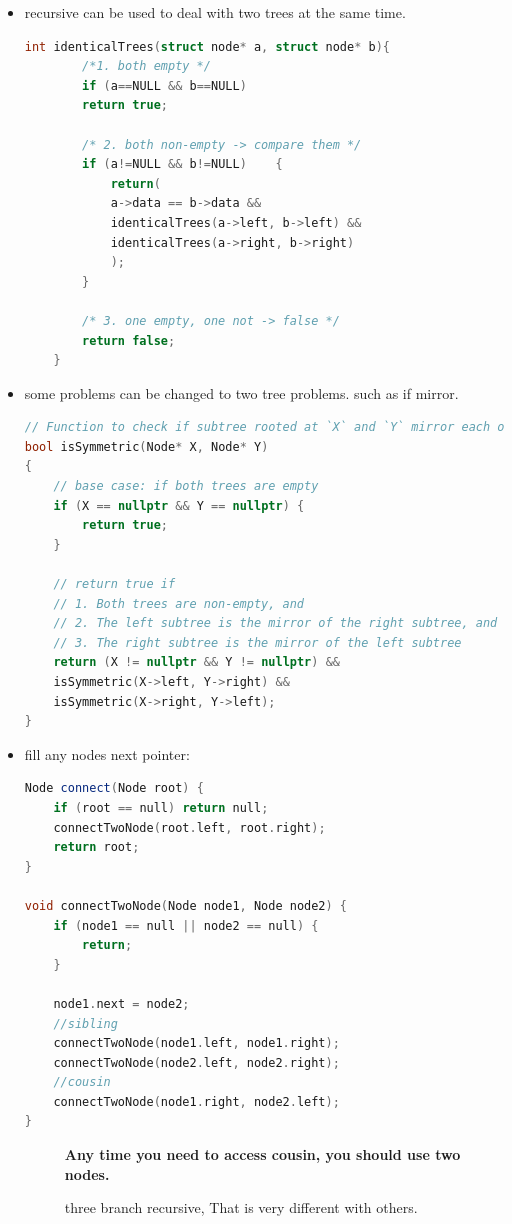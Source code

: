 \documentclass[a4paper,11pt,twoside]{book}
\begin{document}
\begin{itemize}
	\item recursive can be used to deal with two trees at the same time. 
\begin{lstlisting}[frame=single, language=c++]
	int identicalTrees(struct node* a, struct node* b){
		/*1. both empty */
		if (a==NULL && b==NULL)
		return true;
		
		/* 2. both non-empty -> compare them */
		if (a!=NULL && b!=NULL)    {
			return(
			a->data == b->data &&
			identicalTrees(a->left, b->left) &&
			identicalTrees(a->right, b->right)
			);
		} 
		
		/* 3. one empty, one not -> false */
		return false;
	} 
\end{lstlisting}	

\item some problems can be changed to two tree problems. such as if mirror. 

\begin{lstlisting}[frame=single, language=c++]
// Function to check if subtree rooted at `X` and `Y` mirror each other
bool isSymmetric(Node* X, Node* Y)
{
	// base case: if both trees are empty
	if (X == nullptr && Y == nullptr) {
		return true;
	}
	
	// return true if
	// 1. Both trees are non-empty, and
	// 2. The left subtree is the mirror of the right subtree, and
	// 3. The right subtree is the mirror of the left subtree
	return (X != nullptr && Y != nullptr) &&
	isSymmetric(X->left, Y->right) &&
	isSymmetric(X->right, Y->left);
}
\end{lstlisting}


\item fill any nodes next pointer:
\begin{lstlisting}[frame=single, language=c++]
Node connect(Node root) {
	if (root == null) return null;
	connectTwoNode(root.left, root.right);
	return root;
}

void connectTwoNode(Node node1, Node node2) {
	if (node1 == null || node2 == null) {
		return;
	}

	node1.next = node2;
	//sibling	
	connectTwoNode(node1.left, node1.right);
	connectTwoNode(node2.left, node2.right);
	//cousin
	connectTwoNode(node1.right, node2.left);
}
\end{lstlisting}
\begin{description}
	\item[] \textbf{Any time you need to access cousin, you should use two nodes.}
	\item[] three branch recursive, That is very different with others. 
\end{description}


\end{itemize}
\end{document}
